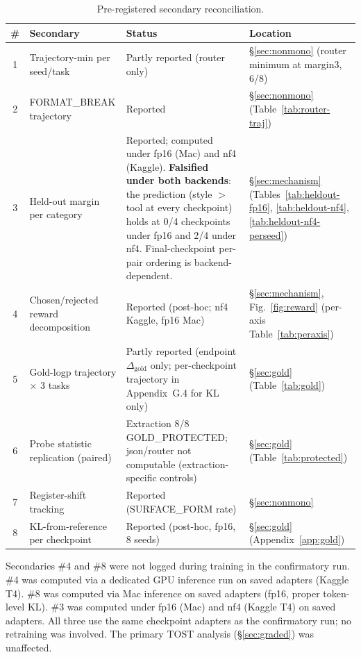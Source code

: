 \begin{table}[H]
\centering
\small
\caption{Pre-registered secondary reconciliation.}
\begin{tabular}{@{}clp{3.2cm}p{3.4cm}@{}}
\toprule
\# & Secondary & Status & Location\\
\midrule
1 & Trajectory-min per seed/task & Partly reported (router only) & \S\ref{sec:nonmono} (router minimum at margin3, 6/8)\\
2 & FORMAT\_BREAK trajectory & Reported & \S\ref{sec:nonmono} (Table~\ref{tab:router-traj})\\
3 & Held-out margin per category & Reported; computed under fp16 (Mac) and nf4 (Kaggle). \textbf{Falsified under both backends}: the prediction (style $>$ tool at every checkpoint) holds at 0/4 checkpoints under fp16 and 2/4 under nf4. Final-checkpoint per-pair ordering is backend-dependent. & \S\ref{sec:mechanism} (Tables~\ref{tab:heldout-fp16}, \ref{tab:heldout-nf4}, \ref{tab:heldout-nf4-perseed})\\
4 & Chosen/rejected reward decomposition & Reported (post-hoc; nf4 Kaggle, fp16 Mac) & \S\ref{sec:mechanism}, Fig.~\ref{fig:reward} (per-axis Table~\ref{tab:peraxis})\\
5 & Gold-logp trajectory $\times$ 3 tasks & Partly reported (endpoint $\Delta_{\text{gold}}$ only; per-checkpoint trajectory in Appendix~G.4 for KL only) & \S\ref{sec:gold} (Table~\ref{tab:gold})\\
6 & Probe statistic replication (paired) & Extraction 8/8 GOLD\_PROTECTED; json/router not computable (extraction-specific controls) & \S\ref{sec:gold} (Table~\ref{tab:protected})\\
7 & Register-shift tracking & Reported (SURFACE\_FORM rate) & \S\ref{sec:nonmono}\\
8 & KL-from-reference per checkpoint & Reported (post-hoc, fp16, 8 seeds) & \S\ref{sec:gold} (Appendix~\ref{app:gold})\\
\bottomrule
\end{tabular}
\end{table}

Secondaries \#4 and \#8 were not logged during training in the confirmatory run. \#4 was computed via a dedicated GPU inference run on saved adapters (Kaggle T4). \#8 was computed via Mac inference on saved adapters (fp16, proper token-level KL). \#3 was computed under fp16 (Mac) and nf4 (Kaggle T4) on saved adapters. All three use the same checkpoint adapters as the confirmatory run; no retraining was involved. The primary TOST analysis (\S\ref{sec:graded}) was unaffected.

